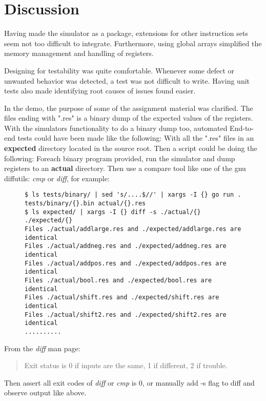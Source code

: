 \section{Discussion}

Having made the simulator as a package, extensions for other instruction sets seem not too difficult to integrate.
Furthermore, using global arrays simplified the memory management and handling of registers. 

Designing for testability was quite comfortable. 
Whenever some defect or unwanted behavior was detected, a test was not difficult to write. 
Having unit tests also made identifying root causes of issues found easier.

In the demo, the purpose of some of the assignment material was clarified. 
The files ending with ".res" is a binary dump of the expected values of the registers.
With the simulators functionality to do a binary dump too, automated End-to-end tests could have been made like the following:
With all the ".res" files in an \textbf{expected} directory located in the source root. 
Then a script could be doing the following:
Foreach binary program provided, run the simulator and dump registers to an \textbf{actual} directory.
Then use a compare tool like one of the gnu diffutils: \textit{cmp} or \textit{diff}, for example:
\begin{figure}[H]
\begin{verbatim}
$ ls tests/binary/ | sed 's/....$//' | xargs -I {} go run . tests/binary/{}.bin actual/{}.res
$ ls expected/ | xargs -I {} diff -s ./actual/{} ./expected/{}
Files ./actual/addlarge.res and ./expected/addlarge.res are identical
Files ./actual/addneg.res and ./expected/addneg.res are identical
Files ./actual/addpos.res and ./expected/addpos.res are identical
Files ./actual/bool.res and ./expected/bool.res are identical
Files ./actual/shift.res and ./expected/shift.res are identical
Files ./actual/shift2.res and ./expected/shift2.res are identical
..........
\end{verbatim}
\end{figure}

From the \textit{diff} man page: 
\begin{quote}
    Exit status is 0 if inputs are the same, 1 if different, 2 if trouble.
\end{quote}

Then assert all exit codes of \textit{diff} or \textit{cmp} is 0, or manually add -s flag to diff and observe output like above.

